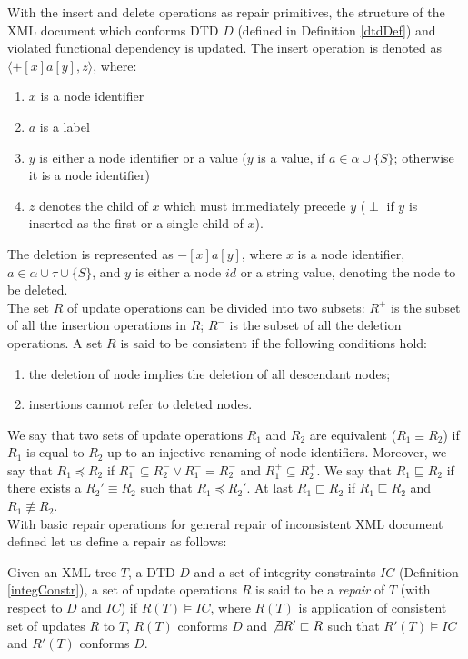 With the insert and delete operations as repair primitives, the structure of the XML document which conforms DTD $D$ (defined in Definition \ref{dtdDef}) and violated functional dependency is updated. The insert operation is denoted as $\langle  + [x]a[y], z\rangle$, where:
\begin{enumerate}
\renewcommand{\labelenumi}{\roman{enumi})}
	\item $x$ is a node identifier
    \item $a$ is a label
    \item $y$ is either a node identifier or a value ($y$ is a value, if $a \in \alpha \cup \{S\}$; otherwise it is a node identifier)
    \item $z$ denotes the child of $x$ which must immediately precede $y$ ($\perp$ if $y$ is inserted as the first or a single child of $x$).
\end{enumerate}

The deletion is represented as $-[x]a[y]$, where $x$ is a node identifier, $a \in \alpha \cup \tau \cup \{S\}$, and $y$ is either a node $id$ or a string value, denoting the node to be deleted.\\
The set $R$ of update operations can be divided into two subsets: $R^+$ is the subset of all the insertion operations in $R$; $R^-$ is the subset of all the deletion operations. A set $R$ is said to be consistent if the following conditions hold:
\begin{enumerate}
	\item the deletion of node implies the deletion of all descendant nodes;
    \item insertions cannot refer to deleted nodes.
\end{enumerate}
We say that two sets of update operations $R_1$ and $R_2$ are equivalent ($R_1 \equiv R_2$) if $R_1$ is equal to $R_2$ up to an injective renaming of node identifiers. Moreover, we say that $R_1 \preceq R_2$ if $R_1^- \subseteq R_2^- \lor R_1^- = R_2^-$ and $R_1^+ \subseteq R_2^+$. We say that $R_1 \sqsubseteq R_2$ if there exists a $R_2' \equiv R_2$ such that  $R_1 \preceq R_2'$. At last $R_1 \sqsubset R_2$ if $R_1 \sqsubseteq R_2$ and $R_1 \not \equiv R_2$.\\

With basic repair operations for general repair of inconsistent XML document defined let us define a repair as follows:

\begin{define}[Repair]
Given an XML tree $T$, a DTD $D$ and a set of integrity constraints $IC$ (Definition \ref{integConstr}), a set of update operations $R$ is said to be a {\sl repair} of $T$ (with respect to $D$ and $IC$) if $R(T) \models IC$, where $R(T)$ is application of consistent set of updates $R$ to $T$, $R(T)$ conforms $D$ and $\not \exists R' \sqsubset R$ such that $R'(T) \models IC$ and $R'(T)$ conforms $D$.
\end{define}

